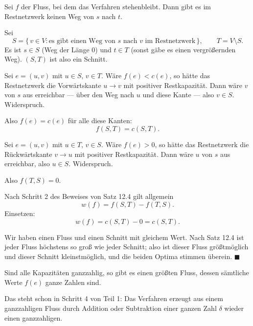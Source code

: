 \begin{merksatz}
Sei $f$ der Fluss, bei dem das Verfahren stehenbleibt. Dann gibt es im Restnetzwerk keinen Weg von $s$ nach $t$.

Sei
\[ S = \{\, v \in V : \text{es gibt einen Weg von } s \text{ nach } v \text{ im Restnetzwerk} \,\} , \qquad T = V \setminus S . \]
Es ist $s \in S$ (Weg der Länge $0$) und $t \in T$ (sonst gäbe es einen vergrößernden Weg). $(S,T)$ ist also ein Schnitt.

Sei $e = (u,v)$ mit $u \in S$, $v \in T$. Wäre $f(e) < c(e)$, so hätte das Restnetzwerk die Vorwärtskante $u \to v$ mit positiver Restkapazität. Dann wäre $v$ von $s$ aus erreichbar --- über den Weg nach $u$ und diese Kante --- also $v \in S$. Widerspruch.

Also $f(e) = c(e)$ für alle diese Kanten:
\[ f(S,T) = c(S,T) . \]

Sei $e = (u,v)$ mit $u \in T$, $v \in S$. Wäre $f(e) > 0$, so hätte das Restnetzwerk die Rückwärtskante $v \to u$ mit positiver Restkapazität. Dann wäre $u$ von $s$ aus erreichbar, also $u \in S$. Widerspruch.

Also $f(T,S) = 0$.

Nach Schritt 2 des Beweises von Satz 12.4 gilt allgemein
\[ w(f) = f(S,T) - f(T,S) . \]
Einsetzen:
\[ w(f) = c(S,T) - 0 = c(S,T) . \]

Wir haben einen Fluss und einen Schnitt mit gleichem Wert. Nach Satz 12.4 ist jeder Fluss höchstens so groß wie jeder Schnitt; also ist dieser Fluss größtmöglich und dieser Schnitt kleinstmöglich, und die beiden Optima stimmen überein. $\blacksquare$
\end{merksatz}

\begin{merksatz}
Sind alle Kapazitäten ganzzahlig, so gibt es einen größten Fluss, dessen sämtliche Werte $f(e)$ ganze Zahlen sind.

Das steht schon in Schritt 4 von Teil 1: Das Verfahren erzeugt aus einem ganzzahligen Fluss durch Addition oder Subtraktion einer ganzen Zahl $\delta$ wieder einen ganzzahligen.

\begin{center}
\begin{minipage}{0.88\textwidth}
\end{minipage}
\end{center}
\end{merksatz}

